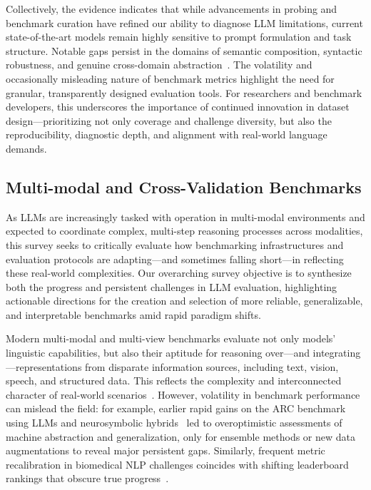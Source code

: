 \documentclass[sigconf]{acmart}
\begin{document}
Collectively, the evidence indicates that while advancements in probing and benchmark curation have refined our ability to diagnose LLM limitations, current state-of-the-art models remain highly sensitive to prompt formulation and task structure. Notable gaps persist in the domains of semantic composition, syntactic robustness, and genuine cross-domain abstraction~\cite{ref92,ref96,ref97,ref99,ref105}. The volatility and occasionally misleading nature of benchmark metrics highlight the need for granular, transparently designed evaluation tools. For researchers and benchmark developers, this underscores the importance of continued innovation in dataset design---prioritizing not only coverage and challenge diversity, but also the reproducibility, diagnostic depth, and alignment with real-world language demands.

\subsection{Multi-modal and Cross-Validation Benchmarks}

As LLMs are increasingly tasked with operation in multi-modal environments and expected to coordinate complex, multi-step reasoning processes across modalities, this survey seeks to critically evaluate how benchmarking infrastructures and evaluation protocols are adapting---and sometimes falling short---in reflecting these real-world complexities. Our overarching survey objective is to synthesize both the progress and persistent challenges in LLM evaluation, highlighting actionable directions for the creation and selection of more reliable, generalizable, and interpretable benchmarks amid rapid paradigm shifts.

Modern multi-modal and multi-view benchmarks evaluate not only models' linguistic capabilities, but also their aptitude for reasoning over---and integrating---representations from disparate information sources, including text, vision, speech, and structured data. This reflects the complexity and interconnected character of real-world scenarios~\cite{ref79,ref85,ref92,ref94,ref95}. However, volatility in benchmark performance can mislead the field: for example, earlier rapid gains on the ARC benchmark using LLMs and neurosymbolic hybrids~\cite{ref92} led to overoptimistic assessments of machine abstraction and generalization, only for ensemble methods or new data augmentations to reveal major persistent gaps. Similarly, frequent metric recalibration in biomedical NLP challenges coincides with shifting leaderboard rankings that obscure true progress~\cite{ref94,ref95}.
\end{document}
